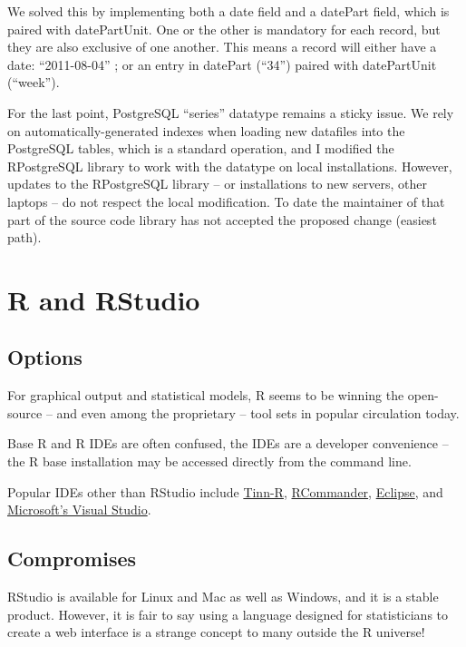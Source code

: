 \documentclass[logos,parttoc,morelanguage=french,morelanguage=german]{orsay-memoire}
\begin{document}
We solved this by implementing both a date field and a datePart field, which is paired with datePartUnit. One or the other is mandatory for each record, but they are also exclusive of one another. This means a record will either have a date: ``2011-08-04'' ; or an entry in datePart (``34'') paired with datePartUnit (``week'').

For the last point, PostgreSQL ``series'' datatype remains a sticky issue. We rely on automatically-generated indexes when loading new datafiles into the PostgreSQL tables, which is a standard operation, and I modified the RPostgreSQL library to work with the datatype on local installations. However, updates to the RPostgreSQL library -- or installations to new servers, other laptops -- do not respect the local modification. To date the maintainer of that part of the source code library has not accepted the proposed change (easiest path). 


\section{R and RStudio}

\subsection{Options}
For graphical output and statistical models, R seems to be winning the open-source -- and even among the proprietary -- tool sets in popular circulation today.

Base R and R IDEs are often confused, the IDEs are a developer convenience -- the R base installation may be accessed directly from the command line.

Popular IDEs other than RStudio include \href{https://sourceforge.net/projects/tinn-r/}{Tinn-R}, \href{https://cran.r-project.org/web/packages/Rcmdr/index.html}{RCommander}, \href{http://www.eclipse.org/downloads/packages/release/Luna/R}{Eclipse}, and \href{https://beta.visualstudio.com/vs/rtvs/}{Microsoft's Visual Studio}.

\subsection{Compromises}

RStudio is available for Linux and Mac as well as Windows, and it is a stable product. However, it is fair to say using a language designed for statisticians to create a web interface is a strange concept to many outside the R universe!
\end{document}
